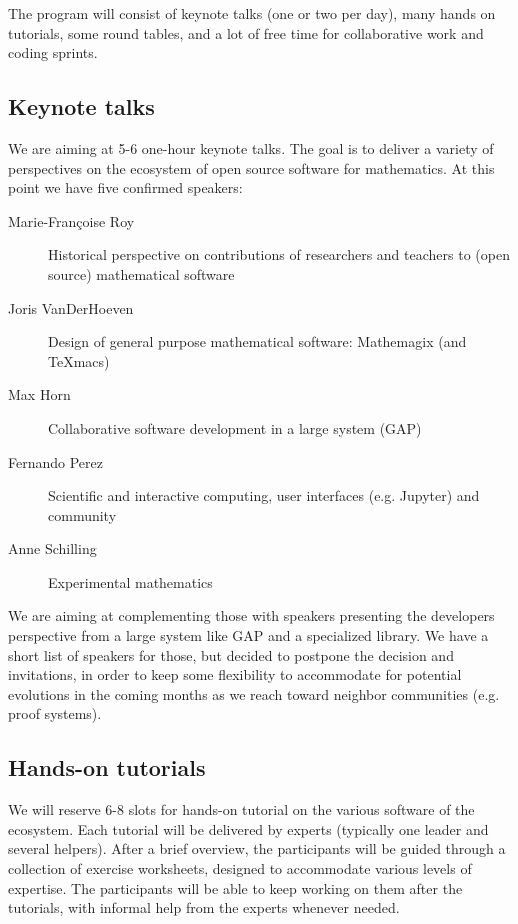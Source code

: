 \documentclass[12pt]{amsart}
\begin{document}
The program will consist of keynote talks (one or two per day), many
hands on tutorials, some round tables, and a lot of free time for
collaborative work and coding sprints.

\subsection{Keynote talks}

We are aiming at 5-6 one-hour keynote talks. The goal is to deliver a
variety of perspectives on the ecosystem of open source software for
mathematics. At this point we have five confirmed speakers:

\begin{description}
\item[Marie-Françoise Roy] Historical perspective on contributions of
  researchers and teachers to (open source) mathematical software
\item[Joris VanDerHoeven] Design of general purpose mathematical software: Mathemagix (and TeXmacs)
\item[Max Horn] Collaborative software development in a large system (GAP)
\item[Fernando Perez] Scientific and interactive computing, user
  interfaces (e.g. Jupyter) and community
\item[Anne Schilling] Experimental mathematics
\end{description}

We are aiming at complementing those with speakers presenting the
developers perspective from a large system like GAP and a specialized
library. We have a short list of speakers for those, but decided to
postpone the decision and invitations, in order to keep some
flexibility to accommodate for potential evolutions in the coming
months as we reach toward neighbor communities (e.g. proof systems).

\subsection{Hands-on tutorials}

We will reserve 6-8 slots for hands-on tutorial on the various
software of the ecosystem. Each tutorial will be delivered by experts
(typically one leader and several helpers). After a brief overview,
the participants will be guided through a collection of exercise
worksheets, designed to accommodate various levels of expertise.  The
participants will be able to keep working on them after the tutorials,
with informal help from the experts whenever needed.
\end{document}

